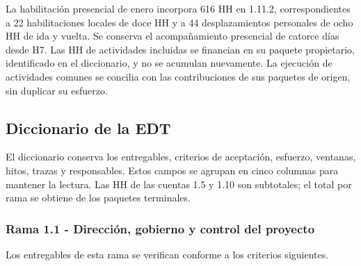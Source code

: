 \documentclass[11pt]{article}
\begin{document}
La habilitación presencial de enero incorpora 616 HH en 1.11.2, correspondientes a 22 habilitaciones locales de doce HH y a 44 desplazamientos personales de ocho HH de ida y vuelta. Se conserva el acompañamiento presencial de catorce días desde H7. Las HH de actividades incluidas se financian en su paquete propietario, identificado en el diccionario, y no se acumulan nuevamente. La ejecución de actividades comunes se concilia con las contribuciones de sus paquetes de origen, sin duplicar su esfuerzo.

\subsection{Diccionario de la EDT}

El diccionario conserva los entregables, criterios de aceptación, esfuerzo, ventanas, hitos, trazas y responsables. Estos campos se agrupan en cinco columnas para mantener la lectura. Las HH de las cuentas 1.5 y 1.10 son subtotales; el total por rama se obtiene de los paquetes terminales.

\subsubsection{Rama 1.1 - Dirección, gobierno y control del proyecto}

Los entregables de esta rama se verifican conforme a los criterios siguientes.
\end{document}
